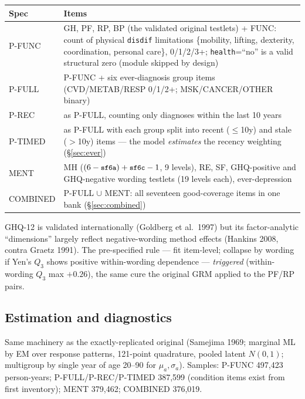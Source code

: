 \documentclass[11pt]{article}
\newcommand{\code}[1]{\texttt{\small #1}}
\begin{document}
\begin{center}\small
\begin{tabular}{lp{11.6cm}}
\toprule
Spec & Items \\
\midrule
P-FUNC & GH, PF, RP, BP (the validated original testlets) + FUNC: count of
physical \code{disdif} limitations \{mobility, lifting, dexterity,
coordination, personal care\}, 0/1/2/3+; \code{health}=``no'' is a valid
structural zero (module skipped by design) \\
P-FULL & P-FUNC + six ever-diagnosis group items (CVD/METAB/RESP 0/1/2+;
MSK/CANCER/OTHER binary) \\
P-REC & as P-FULL, counting only diagnoses within the last 10 years \\
P-TIMED & as P-FULL with each group split into recent ($\le$10y) and stale
($>$10y) items --- the model \emph{estimates} the recency weighting
(\S\ref{sec:ever}) \\
MENT & MH ($(6-\code{sf6a})+\code{sf6c}-1$, 9 levels), RE, SF, GHQ-positive
and GHQ-negative wording testlets (19 levels each), ever-depression \\
COMBINED & P-FULL $\cup$ MENT: all seventeen good-coverage items in one bank
(\S\ref{sec:combined}) \\
\bottomrule
\end{tabular}
\end{center}

GHQ-12 is validated internationally (Goldberg et al.\ 1997) but its
factor-analytic ``dimensions'' largely reflect negative-wording method
effects (Hankins 2008, contra Graetz 1991). The pre-specified rule ---
fit item-level; collapse by wording if Yen's $Q_3$ shows positive
within-wording dependence --- \emph{triggered} (within-wording $Q_3$ max
$+0.26$), the same cure the original GRM applied to the PF/RP pairs.

\subsection{Estimation and diagnostics}
Same machinery as the exactly-replicated original (Samejima 1969; marginal ML
by EM over response patterns, 121-point quadrature, pooled latent
$N(0,1)$; multigroup by single year of age 20--90 for $\mu_a,\sigma_a$).
Samples: P-FUNC 497{,}423 person-years; P-FULL/P-REC/P-TIMED 387{,}599
(condition items exist from first inventory); MENT 379{,}462; COMBINED
376{,}019.
\end{document}
